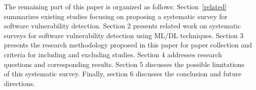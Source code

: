 The remaining part of this paper is organized as follows: Section~\ref{related} summarizes existing studies focusing on proposing a systematic survey for software vulnerability detection.
Section 2 presents related work on systematic surveys for software vulnerability detection using ML/DL techniques.
Section 3 presents the research methodology proposed in this paper for paper collection and criteria for including and excluding studies. Section 4 addresses research questions and corresponding results. Section 5 discusses the possible limitations of this systematic survey. Finally, section 6 discusses the conclusion and future directions. 